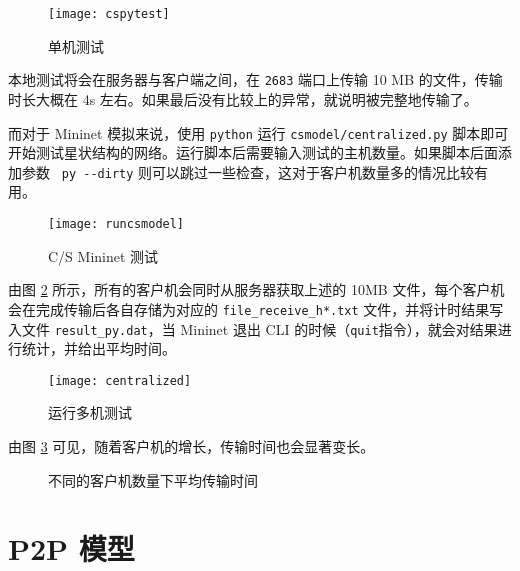 \begin{figure}[H]
    \centering
    \texttt{[image: cspytest]}
    \caption{单机测试}
\end{figure}

本地测试将会在服务器与客户端之间，在 \verb"2683" 端口上传输 10 MB 的文件，传输时长大概在 4s 左右。如果最后没有比较上的异常，就说明被完整地传输了。


而对于 Mininet 模拟来说，使用 \verb"python" 运行 \verb"csmodel/centralized.py" 脚本即可开始测试星状结构的网络。运行脚本后需要输入测试的主机数量。如果脚本后面添加参数 \verb" py --dirty" 则可以跳过一些检查，这对于客户机数量多的情况比较有用。

\begin{figure}[H]
    \centering
    \texttt{[image: runcsmodel]}
    \caption{C/S Mininet 测试}\label{fig:csmodelrun}
\end{figure}

由图 \ref{fig:csmodeltest} 所示，所有的客户机会同时从服务器获取上述的 10MB 文件，每个客户机会在完成传输后各自存储为对应的 \verb"file_receive_h*.txt" 文件，并将计时结果写入文件 \verb"result_py.dat"，当 Mininet 退出 CLI 的时候（\verb"quit"指令），就会对结果进行统计，并给出平均时间。

\begin{figure}[H]
    \centering
    \texttt{[image: centralized]}
    \caption{运行多机测试}\label{fig:csmodeltest}
\end{figure}

由图 \ref{fig:csmodelstat} 可见，随着客户机的增长，传输时间也会显著变长。

\begin{figure}[H]
    \centering
    \caption{不同的客户机数量下平均传输时间}\label{fig:csmodelstat}
\end{figure}    

\section{P2P 模型}

